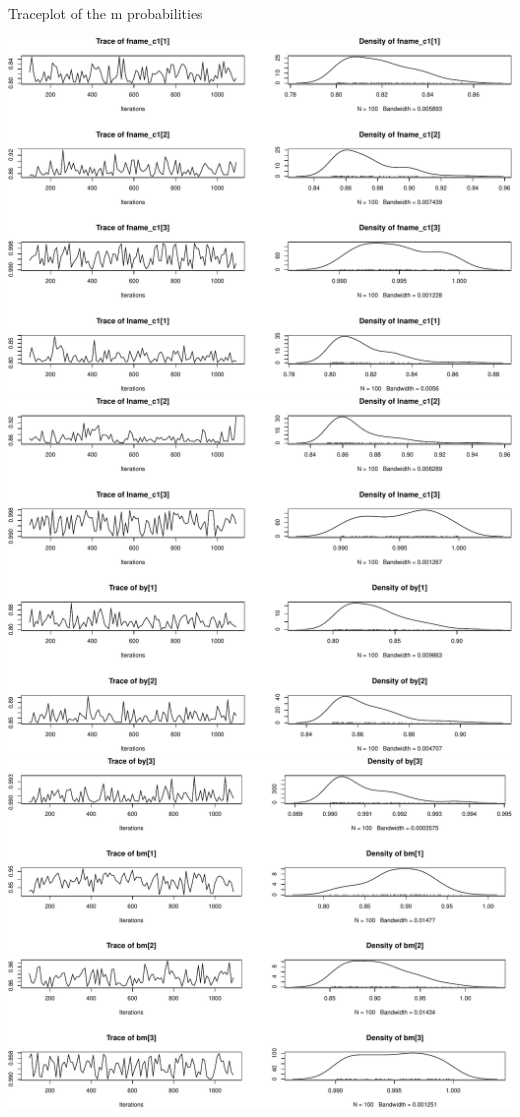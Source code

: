 \documentclass[
  ignorenonframetext,
]{beamer}
\begin{document}
\begin{frame}{Traceplot of the m probabilities}
\protect\hypertarget{traceplot-of-the-m-probabilities}{}

\includegraphics{bayesian-fellegi-sunter-vignette_files/figure-beamer/unnamed-chunk-10-1.pdf}
\includegraphics{bayesian-fellegi-sunter-vignette_files/figure-beamer/unnamed-chunk-10-2.pdf}
\includegraphics{bayesian-fellegi-sunter-vignette_files/figure-beamer/unnamed-chunk-10-3.pdf}

\end{frame}
\end{document}
